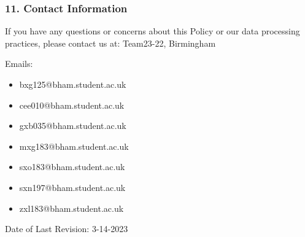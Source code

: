 \documentclass[a4paper]{article}
\begin{document}
\begin{tcolorbox}[colback=gray!20, sharp corners, boxrule=0pt, boxsep=0pt, left=5pt, right=5pt, top=5pt, bottom=5pt]
\subsubsection*{11. Contact Information}
If you have any questions or concerns about this Policy or our data processing practices, please contact us at:
Team23-22,
Birmingham

Emails:
\begin{itemize}[itemsep=0.5\itemsep, parsep=0\parsep]
	\item bxg125@bham.student.ac.uk
	\item cee010@bham.student.ac.uk
	\item gxb035@bham.student.ac.uk
	\item mxg183@bham.student.ac.uk
	\item sxo183@bham.student.ac.uk
	\item sxn197@bham.student.ac.uk
	\item zxl183@bham.student.ac.uk
\end{itemize}

Date of Last Revision: 3-14-2023
\end{tcolorbox}
\end{document}
